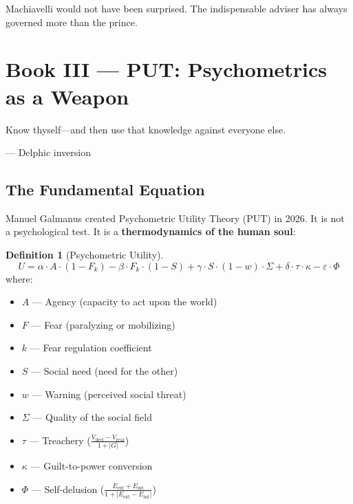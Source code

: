 \documentclass[12pt, a4paper]{article}
\theoremstyle{definition}
\newtheorem{definition}{Definition}
\theoremstyle{remark}
\begin{document}
Machiavelli would not have been surprised. The indispensable adviser has always governed more than the prince.

\newpage


\section{Book III — PUT: Psychometrics as a Weapon}

\epigraph{Know thyself—and then use that knowledge against everyone else.}{— Delphic inversion}

\subsection{The Fundamental Equation}

Manuel Galmanus created Psychometric Utility Theory (PUT) in 2026. It is not a psychological test. It is a \textbf{thermodynamics of the human soul}:

\begin{definition}[Psychometric Utility]
\[
U = \alpha \cdot A \cdot (1-F_k) - \beta \cdot F_k \cdot (1-S) + \gamma \cdot S \cdot (1-w) \cdot \Sigma + \delta \cdot \tau \cdot \kappa - \varepsilon \cdot \Phi
\]
where:
\begin{itemize}[nosep]
    \item $A$ — Agency (capacity to act upon the world)
    \item $F$ — Fear (paralyzing or mobilizing)
    \item $k$ — Fear regulation coefficient
    \item $S$ — Social need (need for the other)
    \item $w$ — Warning (perceived social threat)
    \item $\Sigma$ — Quality of the social field
    \item $\tau$ — Treachery ($\frac{V_{\text{decl}} - V_{\text{real}}}{1 + |G|}$)
    \item $\kappa$ — Guilt-to-power conversion
    \item $\Phi$ — Self-delusion ($\frac{E_{\text{ext}} + E_{\text{int}}}{1 + |E_{\text{ext}} - E_{\text{int}}|}$)
\end{itemize}
\end{definition}
\end{document}
